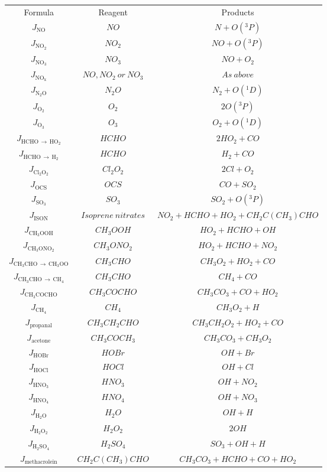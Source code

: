 \documentclass[journal abbreviation, manuscript]{copernicus}
\newcommand{\JNO}{\ensuremath{J_{\mathrm{NO}}}}
\newcommand{\JNOO}{\ensuremath{J_{\mathrm{NO_2}}}}
\newcommand{\JNOOO}{\ensuremath{J_{\mathrm{NO_3}}}}
\newcommand{\JNOx}{\ensuremath{J_{\mathrm{NO_x}}}}
\newcommand{\JNNO}{\ensuremath{J_{\mathrm{N_2O}}}}
\newcommand{\JOO}{\ensuremath{J_{\mathrm{O_2}}}}
\newcommand{\JOOO}{\ensuremath{J_{\mathrm{O_3}}}}
\newcommand{\JHCHOr}{\ensuremath{J_{\mathrm{HCHO} \,\to\, \mathrm{HO_2}}}}
\newcommand{\JHCHOm}{\ensuremath{J_{\mathrm{HCHO} \,\to\, \mathrm{H_2}}}}
\newcommand{\JClClOO}{\ensuremath{J_{\mathrm{Cl_2O_2}}}}
\newcommand{\JOCS}{\ensuremath{J_{\mathrm{OCS}}}}
\newcommand{\JSOOO}{\ensuremath{J_{\mathrm{SO_3}}}}
\newcommand{\JISON}{\ensuremath{J_{\mathrm{ISON}}}}
\newcommand{\JmeOOH}{\ensuremath{J_{\mathrm{CH_3OOH}}}}
\newcommand{\JmeONOO}{\ensuremath{J_{\mathrm{CH_3ONO_2}}}}
\newcommand{\JmeCHOmeOO}{\ensuremath{J_{\mathrm{CH_3CHO} \,\to\, \mathrm{CH_3OO}}}}
\newcommand{\JmeCHOCHHHH}{\ensuremath{J_{\mathrm{CH_3CHO} \,\to\, \mathrm{CH_4}}}}
\newcommand{\JmeCOCHO}{\ensuremath{J_{\mathrm{CH_3COCHO}}}}
\newcommand{\JCHHHH}{\ensuremath{J_{\mathrm{CH_4}}}}
\newcommand{\Jpropanal}{\ensuremath{J_{\mathrm{propanal}}}}
\newcommand{\Jacetone}{\ensuremath{J_{\mathrm{acetone}}}}
\newcommand{\JHOBr}{\ensuremath{J_{\mathrm{HOBr}}}}
\newcommand{\JHOCl}{\ensuremath{J_{\mathrm{HOCl}}}}
\newcommand{\JHNOOO}{\ensuremath{J_{\mathrm{HNO_3}}}}
\newcommand{\JHNOOOO}{\ensuremath{J_{\mathrm{HNO_4}}}}
\newcommand{\JHHO}{\ensuremath{J_{\mathrm{H_2O}}}}
\newcommand{\JHHOO}{\ensuremath{J_{\mathrm{H_2O_2}}}}
\newcommand{\JHHSOOOO}{\ensuremath{J_{\mathrm{H_2SO_4}}}}
\newcommand{\JMACR}{\ensuremath{J_{\mathrm{methacrolein}}}}
\begin{document}
\begin{center}
\begin{tabular}{ |c|c|c| }
\hline
Formula & Reagent & Products \\
\JNO & $NO$ & $N + O(^3P)$ \\
\JNOO & $NO_2$ & $NO + O(^3P)$ \\
\JNOOO & $NO_3$ & $NO + O_2$ \\
\JNOx & $NO, NO_2\ or\ NO_3$ & $As\ above$ \\
\JNNO & $N_2O$ & $N_2 + O(^1D)$ \\
\JOO & $O_2$ & $2O(^3P)$ \\
\JOOO & $O_3$ & $O_2 + O(^1D)$ \\
\JHCHOr & $HCHO$ & $2HO_2 + CO$ \\
\JHCHOm & $HCHO$ & $H_2 + CO$ \\
\JClClOO & $Cl_2O_2$ & $2Cl + O_2$ \\
\JOCS & $OCS$ & $CO + SO_2$ \\
\JSOOO & $SO_3$ & $SO_2 + O(^3P)$ \\
\JISON & $Isoprene\ nitrates$ & $NO_2 + HCHO + HO_2 + CH_2C(CH_3)CHO$ \\
\JmeOOH & $CH_3OOH$ & $HO_2 + HCHO + OH$ \\
\JmeONOO & $CH_3ONO_2$ & $HO_2 + HCHO + NO_2$ \\
\JmeCHOmeOO & $CH_3CHO$ & $CH_3O_2 + HO_2 + CO$ \\
\JmeCHOCHHHH & $CH_3CHO$ & $CH_4 + CO$ \\
\JmeCOCHO & $CH_3COCHO$ & $CH_3CO_3 + CO + HO_2$ \\
\JCHHHH & $CH_4$ & $CH_3O_2 + H$ \\
\Jpropanal & $CH_3CH_2CHO$ & $CH_3CH_2O_2 + HO_2 + CO$ \\
\Jacetone & $CH_3COCH_3$ & $CH_3CO_3 + CH_3O_2$ \\
\JHOBr & $HOBr$ & $OH + Br$ \\
\JHOCl & $HOCl$ & $OH + Cl$ \\
\JHNOOO & $HNO_3$ & $OH + NO_2$ \\
\JHNOOOO & $HNO_4$ & $OH + NO_3$ \\
\JHHO & $H_2O$ & $OH + H$ \\
\JHHOO & $H_2O_2$ & $2OH$ \\
\JHHSOOOO & $H_2SO_4$ & $SO_3 + OH + H$ \\
\JMACR & $CH_2C(CH_3)CHO$ & $CH_3CO_3 + HCHO + CO + HO_2$ \\
\hline
\end{tabular}
\end{center}
\end{document}
